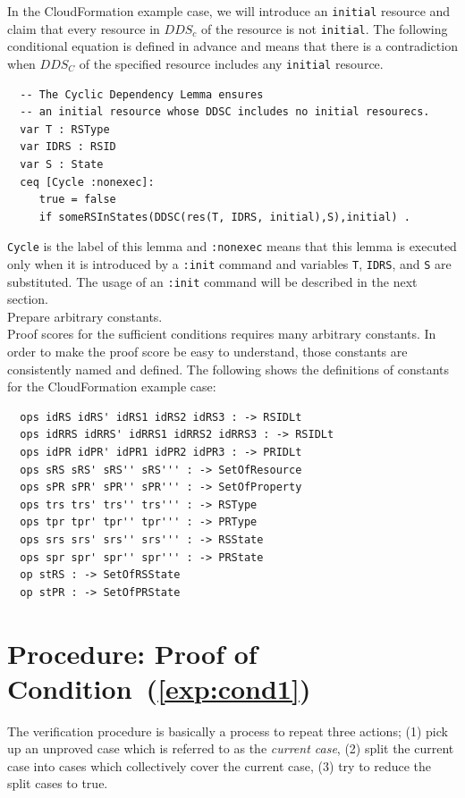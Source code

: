\documentclass[12pt]{report}
\begin{document}
In the CloudFormation example case, we will introduce an {\tt initial}
resource and claim that every resource in $DDS_c$ of the resource is
not {\tt initial}. The following conditional equation is defined in
advance and means that there is a contradiction when $DDS_C$ of the
specified resource includes any {\tt initial} resource.
\small
\begin{verbatim}
  -- The Cyclic Dependency Lemma ensures
  -- an initial resource whose DDSC includes no initial resourecs.
  var T : RSType
  var IDRS : RSID
  var S : State
  ceq [Cycle :nonexec]: 
     true = false
     if someRSInStates(DDSC(res(T, IDRS, initial),S),initial) .
\end{verbatim}
\normalsize
{\tt Cycle} is the label of this lemma and {\tt :nonexec} means that
this lemma is executed only when it is introduced by a {\tt :init}
command and variables {\tt T}, {\tt IDRS}, and {\tt S} are
substituted. The usage of an {\tt :init} command will be described in
the next section.\\

 Prepare arbitrary constants. \\
Proof scores for the sufficient conditions requires many arbitrary constants.
In order to make the proof score be easy to understand, those constants
are consistently named and defined. The following shows the definitions
of constants for the CloudFormation example case:
\small
\begin{verbatim}
  ops idRS idRS' idRS1 idRS2 idRS3 : -> RSIDLt
  ops idRRS idRRS' idRRS1 idRRS2 idRRS3 : -> RSIDLt
  ops idPR idPR' idPR1 idPR2 idPR3 : -> PRIDLt
  ops sRS sRS' sRS'' sRS''' : -> SetOfResource
  ops sPR sPR' sPR'' sPR''' : -> SetOfProperty
  ops trs trs' trs'' trs''' : -> RSType
  ops tpr tpr' tpr'' tpr''' : -> PRType
  ops srs srs' srs'' srs''' : -> RSState
  ops spr spr' spr'' spr''' : -> PRState
  op stRS : -> SetOfRSState
  op stPR : -> SetOfPRState
\end{verbatim}
\normalsize
\section{Procedure: Proof of Condition~(\ref{exp:cond1})}
\label{sec:initcont}
The verification procedure is basically a process to repeat three
actions; (1) pick up an unproved case which is referred to as the
{\it current case}, (2) split the current case into cases which
collectively cover the current case, (3) try to reduce the split cases
to true.
\end{document}
